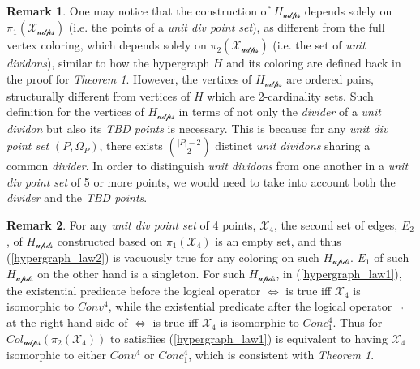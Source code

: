 \documentclass[11pt, oneside]{article}      %
\theoremstyle{definition}
\numberwithin{equation}{section}
\newtheorem*{remark}{Remark}
\newcommand{\reff}[1]{(\ref{#1})}
\theoremstyle{c}
\begin{document}
\begin{remark} One may notice that the construction of $H_{\mathscr{udps}}$ depends solely on $\pi_1(\mathscr{X_{udps}})$ (i.e. the points of a \textit{unit div point set}), as different from the full vertex coloring, which depends solely on $\pi_2(\mathscr{X_{udps}})$ (i.e. the set of \textit{unit dividons}), similar to how the hypergraph $H$ and its coloring are defined back in the proof for \textit{Theorem 1}. However, the vertices of $H_{\mathscr{udps}}$ are ordered pairs, structurally different from vertices of $H$ which are 2-cardinality sets.  Such definition for the vertices of $H_{\mathscr{udps}}$ in terms of not only the \textit{divider} of a \textit{unit dividon} but also its \textit{TBD points} is necessary. This is because for any \textit{unit div point set} $(P,\Omega_P)$, there exists $\binom{|P|-2}{2}$ distinct \textit{unit dividons} sharing a common \textit{divider}. In order to distinguish \textit{unit dividons} from one another in a \textit{unit div point set} of 5 or more points, we would need to take into account both the \textit{divider} and the \textit{TBD points}.
\end{remark}
\begin{remark} For any \textit{unit div point set} of 4 points, $\mathscr{X_4}$, the second set of edges, $E_2$, of $H_{\mathscr{upds}}$ constructed based on $\pi_1(\mathscr{X_4})$ is an empty set, and thus \reff{hypergraph_law2} is vacuously true for any coloring on such $H_{\mathscr{upds}}$. $E_1$ of such $H_{\mathscr{upds}}$ on the other hand is a singleton. For such $H_{\mathscr{upds}}$, in \reff{hypergraph_law1}, the existential predicate before the logical operator $\Leftrightarrow$ is true iff $\mathscr{X_4}$ is isomorphic to $Conv^4$, while the existential predicate after the logical operator $\neg$ at the right hand side of $\Leftrightarrow$ is true iff $\mathscr{X_4}$ is isomorphic to $Conc^4_1$. Thus for $Col_{\mathscr{udps}}(\pi_2(\mathscr{X_4}))$ to satisfiies \reff{hypergraph_law1} is equivalent to having $\mathscr{X_4}$ isomorphic to either $ Conv^4$ or $Conc^4_1$, which is consistent with \textit{Theorem 1}.
\end{remark}
\end{document}

